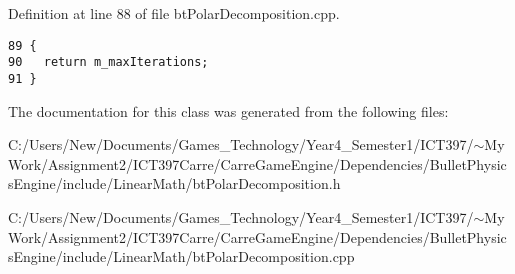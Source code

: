 Definition at line 88 of file btPolarDecomposition.cpp.

\begin{Code}\begin{verbatim}89 {
90   return m_maxIterations;
91 }
\end{verbatim}
\end{Code}




The documentation for this class was generated from the following files:\begin{CompactItemize}
\item 
C:/Users/New/Documents/Games\_\-Technology/Year4\_\-Semester1/ICT397/$\sim$My Work/Assignment2/ICT397Carre/CarreGameEngine/Dependencies/BulletPhysicsEngine/include/LinearMath/btPolarDecomposition.h\item 
C:/Users/New/Documents/Games\_\-Technology/Year4\_\-Semester1/ICT397/$\sim$My Work/Assignment2/ICT397Carre/CarreGameEngine/Dependencies/BulletPhysicsEngine/include/LinearMath/btPolarDecomposition.cpp\end{CompactItemize}
